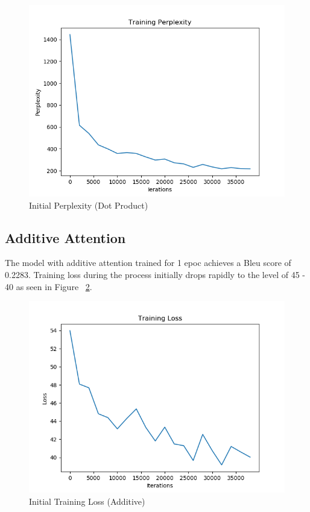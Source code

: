 \documentclass[11pt,a4paper]{article}
\begin{document}
\begin{figure}[!htbp]
\includegraphics[width=\linewidth]{de_dot_ppl_1.png}
\caption{Initial Perplexity (Dot Product)}
\label{fig23}
\end{figure}


\pagebreak

\subsection{Additive Attention}

The model with additive attention trained for 1 epoc achieves a Bleu score of 0.2283.
Training loss during the process initially drops rapidly to the level of 45 - 40 as seen in Figure ~\ref{fig25}. 
\begin{figure}[!htbp]
\includegraphics[width=\linewidth]{de_add_loss_1.png}
\caption{Initial Training Loss (Additive)}
\label{fig25}
\end{figure}
\end{document}

